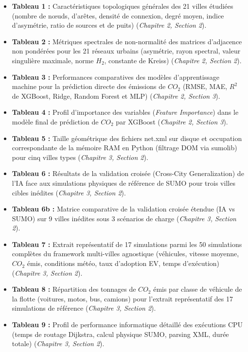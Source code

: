 \documentclass[10pt, a4paper]{article}
\providecommand{\tightlist}{}
\begin{document}
\begin{itemize}
\tightlist
\item
  \textbf{Tableau 1 :} Caractéristiques topologiques générales des 21
  villes étudiées (nombre de nœuds, d'arêtes, densité de connexion,
  degré moyen, indice d'asymétrie, ratio de sources et de puits)
  (\emph{Chapitre 2, Section 2}).
\item
  \textbf{Tableau 2 :} Métriques spectrales de non-normalité des
  matrices d'adjacence non pondérées pour les 21 réseaux urbains
  (asymétrie, rayon spectral, valeur singulière maximale, norme \(H_2\),
  constante de Kreiss) (\emph{Chapitre 2, Section 2}).
\item
  \textbf{Tableau 3 :} Performances comparatives des modèles
  d'apprentissage machine pour la prédiction directe des émissions de
  \(CO_2\) (RMSE, MAE, \(R^2\) de XGBoost, Ridge, Random Forest et MLP)
  (\emph{Chapitre 2, Section 3}).
\item
  \textbf{Tableau 4 :} Profil d'importance des variables (\emph{Feature
  Importance}) dans le modèle final de prédiction de \(CO_2\) par
  XGBoost (\emph{Chapitre 2, Section 3}).
\item
  \textbf{Tableau 5 :} Taille géométrique des fichiers net.xml sur
  disque et occupation correspondante de la mémoire RAM en Python
  (filtrage DOM via sumolib) pour cinq villes types (\emph{Chapitre 3,
  Section 2}).
\item
  \textbf{Tableau 6 :} Résultats de la validation croisée (Cross-City
  Generalization) de l'IA face aux simulations physiques de référence de
  SUMO pour trois villes cibles inédites (\emph{Chapitre 3, Section 2}).
\item
  \textbf{Tableau 6b :} Matrice comparative de la validation croisée
  étendue (IA vs SUMO) sur 9 villes inédites sous 3 scénarios de charge
  (\emph{Chapitre 3, Section 2}).
\item
  \textbf{Tableau 7 :} Extrait représentatif de 17 simulations parmi les
  50 simulations complètes du framework multi-villes agnostique
  (véhicules, vitesse moyenne, \(CO_2\) émis, conditions météo, taux
  d'adoption EV, temps d'exécution) (\emph{Chapitre 3, Section 2}).
\item
  \textbf{Tableau 8 :} Répartition des tonnages de \(CO_2\) émis par
  classe de véhicule de la flotte (voitures, motos, bus, camions) pour
  l'extrait représentatif des 17 simulations de référence
  (\emph{Chapitre 3, Section 2}).
\item
  \textbf{Tableau 9 :} Profil de performance informatique détaillé des
  exécutions CPU (temps de routage Dijkstra, calcul physique SUMO,
  parsing XML, durée totale) (\emph{Chapitre 3, Section 2}).
\end{itemize}
\end{document}
